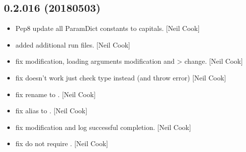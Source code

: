 \documentclass[a4paper,10pt,english]{report}
\begin{document}
\subsection{0.2.016 (2018\sphinxhyphen{}05\sphinxhyphen{}03)}
\label{\detokenize{misc/changelog:id464}}\begin{itemize}
\item {} 
Pep8 update all ParamDict constants to capitals. {[}Neil Cook{]}

\item {} 
 \sphinxhyphen{} added additional run files. {[}Neil Cook{]}

\item {} 
 fix \sphinxhyphen{}  modification, loading arguments modification
and  \textendash{}\textgreater{}  change. {[}Neil Cook{]}

\item {} 
 fix \sphinxhyphen{}  doesn’t work \sphinxhyphen{} just check type instead (and
throw error) {[}Neil Cook{]}

\item {} 
 fix \sphinxhyphen{} rename  to . {[}Neil Cook{]}

\item {} 
 fix \sphinxhyphen{} alias to . {[}Neil Cook{]}

\item {} 
 fix \sphinxhyphen{}  modification and log successful
completion. {[}Neil Cook{]}

\item {} 
 fix \sphinxhyphen{} do not require . {[}Neil Cook{]}

\end{itemize}
\end{document}
